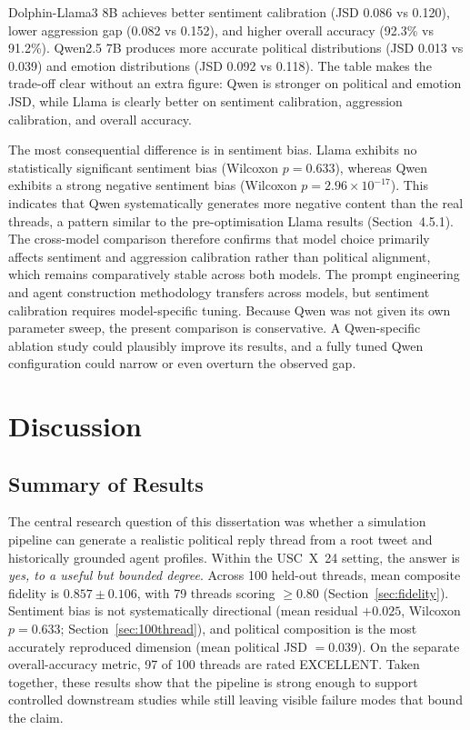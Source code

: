 \documentclass[logo,bsc,singlespacing,parskip,online]{infthesis}
\begin{document}
Dolphin-Llama3 8B achieves better sentiment calibration (JSD 0.086 vs 0.120), lower aggression gap (0.082 vs 0.152), and higher overall accuracy (92.3\% vs 91.2\%). Qwen2.5 7B produces more accurate political distributions (JSD 0.013 vs 0.039) and emotion distributions (JSD 0.092 vs 0.118). The table makes the trade-off clear without an extra figure: Qwen is stronger on political and emotion JSD, while Llama is clearly better on sentiment calibration, aggression calibration, and overall accuracy.

The most consequential difference is in sentiment bias. Llama exhibits no statistically significant sentiment bias (Wilcoxon $p = 0.633$), whereas Qwen exhibits a strong negative sentiment bias (Wilcoxon $p = 2.96 \times 10^{-17}$). This indicates that Qwen systematically generates more negative content than the real threads, a pattern similar to the pre-optimisation Llama results (Section~4.5.1). The cross-model comparison therefore confirms that model choice primarily affects sentiment and aggression calibration rather than political alignment, which remains comparatively stable across both models. The prompt engineering and agent construction methodology transfers across models, but sentiment calibration requires model-specific tuning. Because Qwen was not given its own parameter sweep, the present comparison is conservative. A Qwen-specific ablation study could plausibly improve its results, and a fully tuned Qwen configuration could narrow or even overturn the observed gap.

\section{Discussion}
\label{sec:discussion}

\subsection{Summary of Results}

The central research question of this dissertation was whether a simulation pipeline can generate a realistic political reply thread from a root tweet and historically grounded agent profiles. Within the USC~X~24 setting, the answer is \emph{yes, to a useful but bounded degree}. Across 100 held-out threads, mean composite fidelity is $0.857 \pm 0.106$, with 79 threads scoring $\geq 0.80$ (Section~\ref{sec:fidelity}). Sentiment bias is not systematically directional (mean residual $+0.025$, Wilcoxon $p = 0.633$; Section~\ref{sec:100thread}), and political composition is the most accurately reproduced dimension (mean political JSD $= 0.039$). On the separate overall-accuracy metric, 97 of 100 threads are rated EXCELLENT. Taken together, these results show that the pipeline is strong enough to support controlled downstream studies while still leaving visible failure modes that bound the claim.
\end{document}
